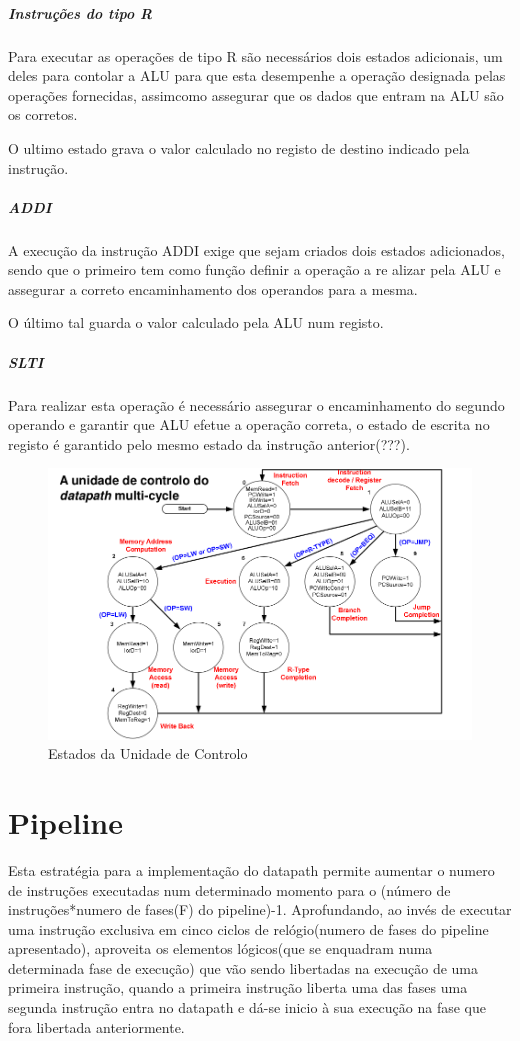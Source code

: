 \documentclass[10pt,a4paper]{book}
\begin{document}
			\subparagraph{Instruções do tipo R}
			 	Para executar as operações de tipo R são necessários dois estados adicionais, um deles para contolar a ALU para que esta desempenhe a operação designada pelas operações fornecidas, assimcomo assegurar que os dados que entram na ALU são os corretos.

				O ultimo estado  grava o valor calculado no registo de destino indicado pela instrução.

			\subparagraph{ADDI}
				A execução da instrução ADDI exige que sejam criados dois estados adicionados, sendo que o primeiro tem como função definir a operação a re alizar pela ALU e assegurar a correto encaminhamento dos operandos para a mesma.

				O último tal guarda o valor calculado pela ALU num registo.

			\subparagraph{SLTI}

				Para realizar esta operação é necessário assegurar o encaminhamento do segundo operando e garantir que ALU efetue a operação correta, o estado de escrita no registo é garantido pelo mesmo estado da instrução anterior(???).



				\begin{figure}[htp]
			    	\centering
			    	\includegraphics[scale=0.4]{FSm.png}
			    	\caption{Estados da Unidade de Controlo }
			    	\label{multy-cycle FSM}
				\end{figure}


  \section{Pipeline}

    Esta estratégia para a implementação do datapath permite aumentar o numero de instruções executadas num determinado momento para o (número de instruções*numero de fases(F) do pipeline)-1. Aprofundando, ao invés de executar uma instrução exclusiva em cinco ciclos de relógio(numero de fases do pipeline apresentado), aproveita os elementos lógicos(que se enquadram numa determinada fase de execução) que vão sendo libertadas na execução de uma primeira instrução, quando a primeira instrução liberta uma das fases uma segunda instrução entra no datapath e dá-se inicio à sua execução na fase que fora libertada anteriormente.
\end{document}
